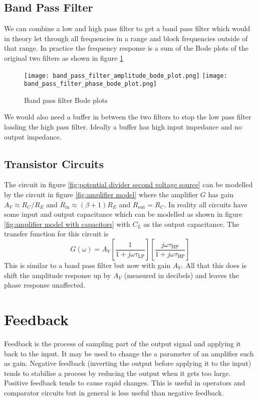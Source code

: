 \documentclass{article}
\begin{document}
    \subsection{Band Pass Filter}
    We can combine a low and high pass filter to get a band pass filter which would in theory let through all frequencies in a range and block frequencies outside of that range.
    In practice the frequency response is a sum of the Bode plots of the original two filters as shown in figure \ref{fig:band pass filter}
    \begin{figure}[ht]
        \centering
        \texttt{[image: band\_pass\_filter\_amplitude\_bode\_plot.png]}
        \texttt{[image: band\_pass\_filter\_phase\_bode\_plot.png]}
        \caption{Band pass filter Bode plots}
        \label{fig:band pass filter}
    \end{figure}
    We would also need a buffer in between the two filters to stop the low pass filter loading the high pass filter.
    Ideally a buffer has high input impedance and no output impedance.
    
    \subsection{Transistor Circuits}
    The circuit in figure \ref{fig:potential divider second voltage source} can be modelled by the circuit in figure \ref{fig:amplifier model} where the amplifier \(G\) has gain \(A_V\approx R_C/R_E\) and \(R_\text{in}\approx (\beta + 1)R_E\) and \(R_\text{out} = R_C\).
    In reality all circuits have some input and output capacitance which can be modelled as shown in figure \ref{fig:amplifier model with capacitors} with \(C_L\) as the output capacitance.
    The transfer function for this circuit is
    \[G(\omega) = A_V\left[\frac{1}{1 + j\omega \tau_\text{LP}}\right]\left[\frac{j\omega\tau_\text{HP}}{1 + j\omega\tau_\text{HP}}\right]\]
    This is similar to a band pass filter but now with gain \(A_V\).
    All that this does is shift the amplitude response up by \(A_V\) (measured in decibels) and leaves the phase response unaffected.
    
    \section{Feedback}
    
    Feedback is the process of sampling part of the output signal and applying it back to the input.
    It may be used to change the a parameter of an amplifier such as gain.
    Negative feedback (inverting the output before applying it to the input) tends to stabilise a process by reducing the output when it gets too large.
    Positive feedback tends to cause rapid changes.
    This is useful in operators and comparator circuits but in general is less useful than negative feedback.
    
\end{document}
